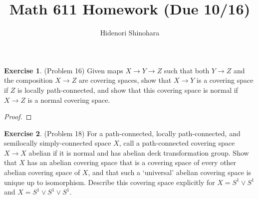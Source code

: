 \documentclass[12pt, psamsfonts]{amsart}
\theoremstyle{definition}
\newtheorem*{exer}{Exercise}
\theoremstyle{remark}
\numberwithin{equation}{section}
\begin{document}
\title{Math 611 Homework (Due 10/16)}
\author{Hidenori Shinohara}
\maketitle

\begin{exer}{(Problem 16)}
  Given maps $X \rightarrow Y \rightarrow Z$ such that both $Y \rightarrow Z$ and the composition $X \rightarrow Z$ are covering spaces, show that $X \rightarrow Y$ is a covering space if $Z$ is locally path-connected, and show that this covering space is normal if $X \rightarrow Z$ is a normal covering space.
\end{exer}

\begin{proof}
\end{proof}

\begin{exer}{(Problem 18)}
  For a path-connected, locally path-connected, and semilocally simply-connected space $X$, call a path-connected covering space $X \rightarrow X$ abelian if it is normal and has abelian deck transformation group.
  Show that $X$ has an abelian covering space that is a covering space of every other abelian covering space of $X$, and that such a `universal' abelian covering space is unique up to isomorphism.
  Describe this covering space explicitly for $X = S^1 \vee S^1$ and $X = S^1 \vee S^1 \vee S^1$.
\end{exer}
\end{document}
